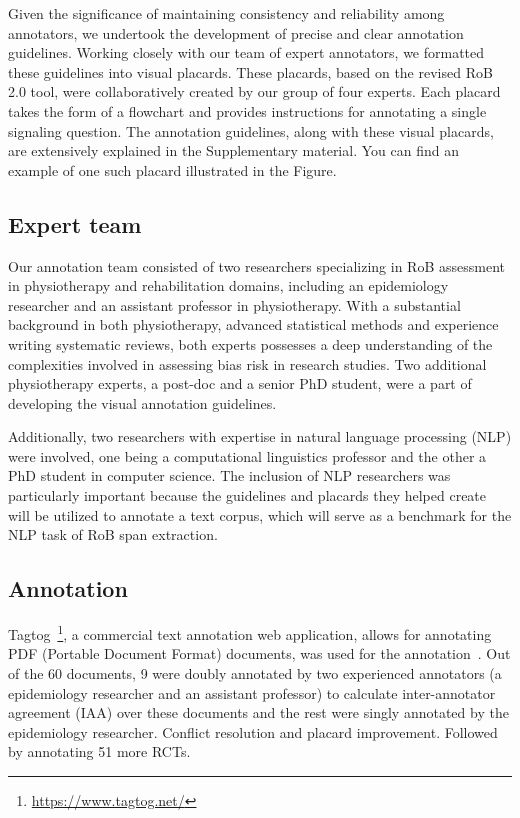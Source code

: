 \documentclass[sn-mathphys,Numbered]{sn-jnl}%
\theoremstyle{thmstyleone}%
\theoremstyle{thmstyletwo}%
\theoremstyle{thmstylethree}%
\begin{document}
Given the significance of maintaining consistency and reliability among annotators, we undertook the development of precise and clear annotation guidelines.
Working closely with our team of expert annotators, we formatted these guidelines into visual placards.
These placards, based on the revised RoB 2.0 tool, were collaboratively created by our group of four experts.
Each placard takes the form of a flowchart and provides instructions for annotating a single signaling question.
The annotation guidelines, along with these visual placards, are extensively explained in the Supplementary material.
You can find an example of one such placard illustrated in the Figure.
%
%
%
\subsection{Expert team}
\label{experts}
%
Our annotation team consisted of two researchers specializing in RoB assessment in physiotherapy and rehabilitation domains, including an epidemiology researcher and an assistant professor in physiotherapy.
With a substantial background in both physiotherapy, advanced statistical methods and experience writing systematic reviews, both experts possesses a deep understanding of the complexities involved in assessing bias risk in research studies.
Two additional physiotherapy experts, a post-doc and a senior PhD student, were a part of developing the visual annotation guidelines.


Additionally, two researchers with expertise in natural language processing (NLP) were involved, one being a computational linguistics professor and the other a PhD student in computer science.
The inclusion of NLP researchers was particularly important because the guidelines and placards they helped create will be utilized to annotate a text corpus, which will serve as a benchmark for the NLP task of RoB span extraction.
%
%
%
\subsection{Annotation}
\label{annotation}
%
Tagtog~\footnote{\url{https://www.tagtog.net/}}, a commercial text annotation web application, allows for annotating PDF (Portable Document Format) documents, was used for the annotation~\cite{cejuela2014tagtog}.
Out of the 60 documents, 9 were doubly annotated by two experienced annotators (a epidemiology researcher and an assistant professor) to calculate inter-annotator agreement (IAA) over these documents and the rest were singly annotated by the epidemiology researcher.
Conflict resolution and placard improvement.
Followed by annotating 51 more RCTs. %
\end{document}
